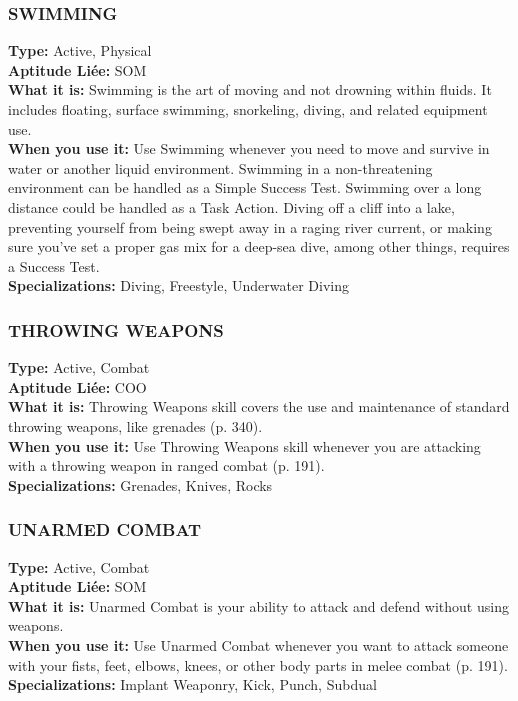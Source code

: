 \subsubsection{SWIMMING} \textbf{Type:} Active, Physical \\ \textbf{Aptitude Liée:} SOM \\ \textbf{What it is:} Swimming is the art of moving and not drowning within fluids. It includes floating, surface swimming, snorkeling, diving, and related equipment use. \\ \textbf{When you use it:} Use Swimming whenever you need to move and survive in water or another liquid environment. Swimming in a non-threatening environment can be handled as a Simple Success Test. Swimming over a long distance could be handled as a Task Action. Diving off a cliff into a lake, preventing yourself from being swept away in a raging river current, or making sure you’ve set a proper gas mix for a deep-sea dive, among other things, requires a Success Test. \\ \textbf{Specializations:} Diving, Freestyle, Underwater Diving 

\subsubsection{THROWING WEAPONS} \textbf{Type:} Active, Combat \\ \textbf{Aptitude Liée:} COO \\ \textbf{What it is:} Throwing Weapons skill covers the use and maintenance of standard throwing weapons, like grenades (p. 340). \\ \textbf{When you use it:} Use Throwing Weapons skill whenever you are attacking with a throwing weapon in ranged combat (p. 191). \\ \textbf{Specializations:} Grenades, Knives, Rocks 







\subsubsection{UNARMED COMBAT} \textbf{Type:} Active, Combat \\ \textbf{Aptitude Liée:} SOM \\ \textbf{What it is:} Unarmed Combat is your ability to attack and defend without using weapons. \\ \textbf{When you use it:} Use Unarmed Combat whenever you want to attack someone with your fists, feet, elbows, knees, or other body parts in melee combat (p. 191). \\ \textbf{Specializations:} Implant Weaponry, Kick, Punch, Subdual 

